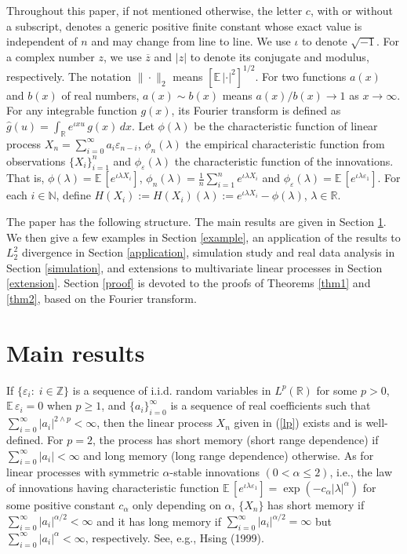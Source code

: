 \documentclass[11pt]{article}
\def\R{{\mathbb R}}
\def\E{{{\mathbb E}\,}}
\def\Z{{\mathbb Z}}
\def\N{{\mathbb N}}
\begin{document}
Throughout this paper, if not mentioned otherwise, the letter $c$, with or without a subscript, denotes a generic positive finite constant whose exact value is independent of $n$ and may change from line to line. We use $\iota$ to denote $\sqrt{-1}$. For a complex number $z$, we use $\overline{z}$ and $|z|$ to denote its conjugate and modulus, respectively. The notation $\|\cdot\|_2$ means $[\E |\cdot|^2]^{1/2}$. For two functions $a(x)$ and $b(x)$ of real numbers,  
$a(x)\mathbb{\sim}b(x)$ means $a(x)/b(x)\rightarrow1$ as $x\rightarrow \infty$.  For any integrable function $g(x)$, its Fourier transform is defined as $\widehat{g}(u)=\int_{\R} e^{\iota x u}\, g(x)\, dx$. Let $\phi(\lambda)$ be the characteristic function of linear process $X_n=\sum\limits^{\infty}_{i=0} a_i\varepsilon_{n-i}$, $\phi_n(\lambda)$ the empirical characteristic function from observations $\{X_i\}_{i=1}^n$ and $\phi_{\varepsilon}(\lambda)$ the characteristic function of the innovations. That is, $\phi(\lambda)=\E[e^{\iota \lambda  X_i}]$, $\phi_n(\lambda)=\frac{1}{n}\sum\limits^n_{i=1} e^{\iota \lambda X_i}$ and $\phi_{\varepsilon}(\lambda)=\E[e^{\iota \lambda  \varepsilon_1}]$.   For each $i\in\N$, define $H(X_i):=H(X_i)(\lambda):=e^{\iota \lambda X_i}-\phi(\lambda)$,  $\lambda\in\R$. 

The paper has the following structure. The main results are given in Section \ref{main}.  We then give a few examples in Section \ref{example}, an application of the results to $L^2_2$ divergence in Section \ref{application}, simulation study and real data analysis in Section \ref{simulation}, and extensions to multivariate linear processes in Section \ref{extension}. Section \ref{proof} is devoted to the proofs of Theorems \ref{thm1} and \ref{thm2}, based on the Fourier transform. 

\bigskip


\section{Main results}\label{main}
If $\{\varepsilon_{i}:\; i\in\Z\}$ is a sequence of i.i.d. random variables in $L^{p}(\R)$ for some $p>0$, $\E\varepsilon_{i}=0$ when $p\geq 1$, and
$\{a_{i}\}^{\infty}_{i=0}$ is a sequence of real coefficients such that $\sum\limits_{i=0}^{\infty}|a_{i}
|^{2\wedge p}<\infty$, then the linear process $X_n$ given in (\ref{lp}) 
exists and is well-defined. For $p=2$, the
process has short memory (short range dependence) if $\sum\limits^{\infty}_{i=0}|a_i|<\infty$ and long memory (long range dependence)  otherwise.
As for linear processes with symmetric $\alpha$-stable innovations $(0<\alpha\leq 2)$, i.e., the law of innovations having characteristic function $\E[e^{\iota\lambda\varepsilon_1}]=\exp(-c_{\alpha}|\lambda|^\alpha)$ for some positive constant $c_{\alpha}$ only depending on $\alpha$, $\{X_n\}$  has short memory if $\sum\limits_{i=0}^\infty |a_i|^{\alpha/2}<\infty$ and it has long memory if $\sum\limits_{i=0}^\infty |a_i|^{\alpha/2}=\infty$ but $\sum\limits_{i=0}^\infty |a_i|^{\alpha}<\infty$, respectively.  See, e.g., Hsing (1999). 
\end{document}
